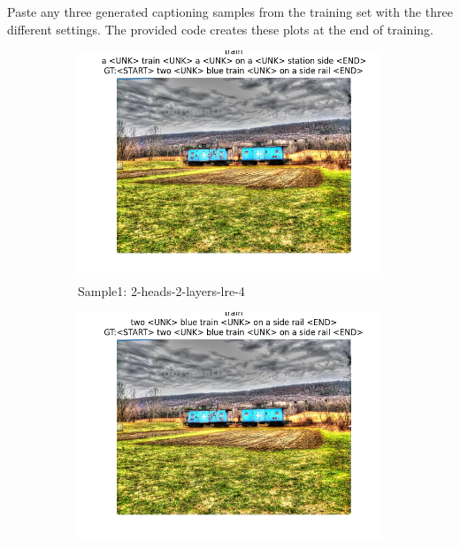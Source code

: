 \documentclass[11pt,addpoints,answers]{exam}
\numberwithin{equation}{section} %
\numberwithin{figure}{section} %
\numberwithin{table}{section} %
\begin{document}
\begin{questions}
\begin{figure}[H]
\end{figure}
\question Paste any three generated captioning samples from the training set with the three different settings. The provided code creates these plots at the end of training.
\\
\begin{figure}[H]
    \centering
    \begin{subfigure}[b]{0.32\linewidth}
        \includegraphics[width=\linewidth]{../transformer_captioning/plots 2/case1_train_1.png}
        \caption{Sample1: 2-heads-2-layers-lre-4}
    \end{subfigure}
    \begin{subfigure}[b]{0.32\linewidth}
        \includegraphics[width=\linewidth]{../transformer_captioning/plots 2/case2_train_1.png}

\end{subfigure}
\end{figure}
\end{questions}
\end{document}
